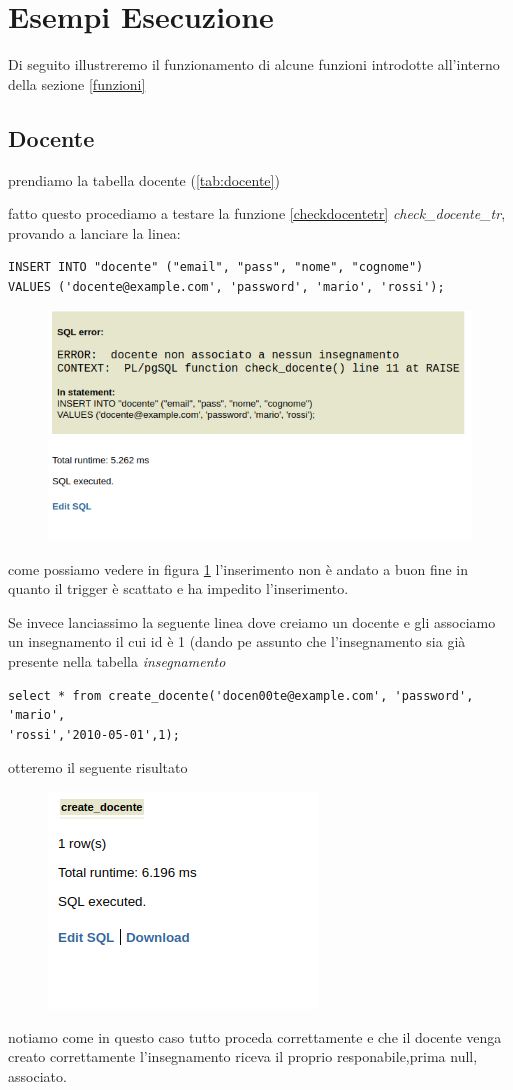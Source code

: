\section{Esempi Esecuzione}
Di seguito illustreremo il funzionamento  di alcune funzioni introdotte all'interno della sezione \ref{funzioni}
\subsection{Docente}
prendiamo la tabella docente (\ref{tab:docente})

fatto questo procediamo a testare la funzione \ref{checkdocentetr} \textit{check\_docente\_tr}, provando a lanciare la linea: 
\begin{lstlisting}[style=sqlStyle]
INSERT INTO "docente" ("email", "pass", "nome", "cognome")
VALUES ('docente@example.com', 'password', 'mario', 'rossi');

\end{lstlisting}

\begin{figure}[ht]
    \centering
    \includegraphics[width=0.9\linewidth]{images/createDocente.png}
    \label{error:createDoncenteInsert}
\end{figure}
come possiamo vedere in figura \ref{error:createDoncenteInsert} l'inserimento  non è andato a buon fine in quanto il trigger è scattato e ha impedito l'inserimento.


Se invece lanciassimo  la seguente linea dove creiamo un docente e gli associamo un insegnamento il cui id è 1 (dando pe assunto che l'insegnamento sia già presente nella tabella \textit{insegnamento}

\begin{lstlisting}[style=sqlStyle]
select * from create_docente('docen00te@example.com', 'password', 'mario', 
'rossi','2010-05-01',1);
\end{lstlisting}
otteremo il seguente risultato 
\begin{figure}[ht]
    \centering
    \includegraphics[width=0.2\linewidth]{images/succcesCrateDocente.png}
    \label{succ:creaDocenmtefc}
\end{figure}
notiamo come in questo caso tutto proceda correttamente e che il docente venga creato correttamente l'insegnamento riceva il proprio responabile,prima null, associato.

